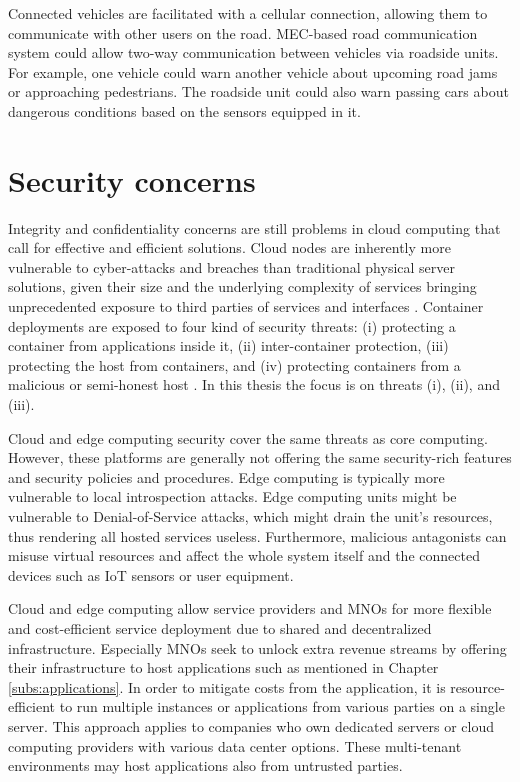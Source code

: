 Connected vehicles are facilitated with a cellular connection, allowing them to communicate with other users on the road. MEC-based road communication system could allow two-way communication between vehicles via roadside units. For example, one vehicle could warn another vehicle about upcoming road jams or approaching pedestrians. The roadside unit could also warn passing cars about dangerous conditions based on the sensors equipped in it. \cite{Abbas2018}

\section{Security concerns}
\label{section:security}

Integrity and confidentiality concerns are still problems in cloud computing that call for effective and efficient solutions. Cloud nodes are inherently more vulnerable to cyber-attacks and breaches than traditional physical server solutions, given their size and the underlying complexity of services bringing unprecedented exposure to third parties of services and interfaces \cite{Lombardi2011}. Container deployments are exposed to four kind of security threats: (i) protecting a container from applications inside it, (ii) inter-container protection, (iii) protecting the host from containers, and (iv) protecting containers from a malicious or semi-honest host \cite{Flauzac2020}. In this thesis the focus is on threats (i), (ii), and (iii).

Cloud and edge computing security cover the same threats as core computing. However, these platforms are generally not offering the same security-rich features and security policies and procedures. Edge computing is typically more vulnerable to local introspection attacks. Edge computing units might be vulnerable to Denial-of-Service attacks, which might drain the unit's resources, thus rendering all hosted services useless. Furthermore, malicious antagonists can misuse virtual resources and affect the whole system itself and the connected devices such as IoT sensors or user equipment. \cite{EdgeComputing5G}\cite{Abbas2018}

Cloud and edge computing allow service providers and MNOs for more flexible and cost-efficient service deployment due to shared and decentralized infrastructure. Especially MNOs seek to unlock extra revenue streams by offering their infrastructure to host applications such as mentioned in Chapter \ref{subs:applications}. In order to mitigate costs from the application, it is resource-efficient to run multiple instances or applications from various parties on a single server. This approach applies to companies who own dedicated servers or cloud computing providers with various data center options. These multi-tenant environments may host applications also from untrusted parties.

